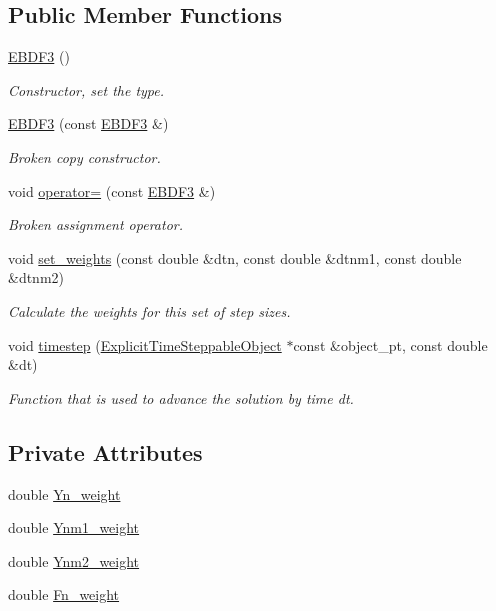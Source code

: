 \subsection*{Public Member Functions}
\begin{DoxyCompactItemize}
\item 
\hyperlink{classoomph_1_1EBDF3_a41eabb83a2e76c91dcdc164c6512bc8c}{E\+B\+D\+F3} ()
\begin{DoxyCompactList}\small\item\em Constructor, set the type. \end{DoxyCompactList}\item 
\hyperlink{classoomph_1_1EBDF3_ab6273e66732d27792e90a3cd0d11e0b1}{E\+B\+D\+F3} (const \hyperlink{classoomph_1_1EBDF3}{E\+B\+D\+F3} \&)
\begin{DoxyCompactList}\small\item\em Broken copy constructor. \end{DoxyCompactList}\item 
void \hyperlink{classoomph_1_1EBDF3_af2fe236410d490fa5a440c035a821c3a}{operator=} (const \hyperlink{classoomph_1_1EBDF3}{E\+B\+D\+F3} \&)
\begin{DoxyCompactList}\small\item\em Broken assignment operator. \end{DoxyCompactList}\item 
void \hyperlink{classoomph_1_1EBDF3_a742b80449f93d0fa1604891b19e58110}{set\+\_\+weights} (const double \&dtn, const double \&dtnm1, const double \&dtnm2)
\begin{DoxyCompactList}\small\item\em Calculate the weights for this set of step sizes. \end{DoxyCompactList}\item 
void \hyperlink{classoomph_1_1EBDF3_a273b7eaa19d2e95d6392e6d8dc2970d9}{timestep} (\hyperlink{classoomph_1_1ExplicitTimeSteppableObject}{Explicit\+Time\+Steppable\+Object} $\ast$const \&object\+\_\+pt, const double \&dt)
\begin{DoxyCompactList}\small\item\em Function that is used to advance the solution by time dt. \end{DoxyCompactList}\end{DoxyCompactItemize}
\subsection*{Private Attributes}
\begin{DoxyCompactItemize}
\item 
double \hyperlink{classoomph_1_1EBDF3_a150ab6a608fee6e927c537b44daddefa}{Yn\+\_\+weight}
\item 
double \hyperlink{classoomph_1_1EBDF3_ab0bdca19eac51af44469035ad9ccd3a1}{Ynm1\+\_\+weight}
\item 
double \hyperlink{classoomph_1_1EBDF3_a4f4bf6b76694fc89cbf516a2388cff00}{Ynm2\+\_\+weight}
\item 
double \hyperlink{classoomph_1_1EBDF3_ad79bff41bb685114506252f24dd3e17e}{Fn\+\_\+weight}
\end{DoxyCompactItemize}
